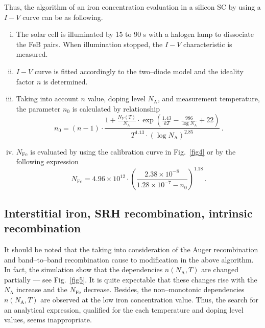 \documentclass [sort&compress] {elsarticle}
\begin{document}
Thus, the algorithm of an iron concentration evaluation in a silicon SC by using a $I-V$ curve can be as following.
\begin{enumerate}[(i)]
\item The solar cell is illuminated by 15 to 90 s with a halogen lamp to dissociate the FeB pairs.
      When illumination stopped, the $I-V$ characteristic is measured.
\item $I-V$ curve is fitted accordingly to the two--diode model and the ideality factor $n$ is determined.
\item Taking into account $n$ value, doping level $N_\mathrm{A}$, and measurement temperature,
      the parameter $n_0$ is calculated by relationship
\begin{displaymath}
    n_0=(n-1)\cdot \frac{1+\frac{N_V(T)}{N_\mathrm{A}}\cdot\exp\left(\frac{1.43}{kT}-\frac{986}{\log N_\mathrm{A}}+22\right)}{T^{1.13}\cdot(\log N_\mathrm{A})^{2.85}}\,.
\end{displaymath}
\item $N_\mathrm{Fe}$ is evaluated by using the calibration curve in Fig.~\ref{fig4} or by the following expression
\begin{displaymath}
    N_\mathrm{Fe}=4.96\times10^{12}\cdot \left(\frac{2.38\times10^{-8}}{1.28\times10^{-7}-n_0}\right)^{1.18}\,.
\end{displaymath}
\end{enumerate}


\subsection{Interstitial iron, SRH recombination, intrinsic recombination}


It should be noted that the taking into consideration of the Auger recombination and band--to--band recombination  cause to modification in the above  algorithm.
In fact, the simulation show that the dependencies $n(N_\mathrm{A},T)$ are changed partially --- see Fig.~\ref{fig5}.
It is quite expectable that these changes rise with the $N_\mathrm{A}$ increase and the $N_\mathrm{Fe}$ decrease.
Besides, the non--monotonic dependencies $n(N_\mathrm{A},T)$ are observed at the low iron concentration value.
Thus, the search for an analytical expression, qualified for the each temperature and doping level values, seems inappropriate.
\end{document}
